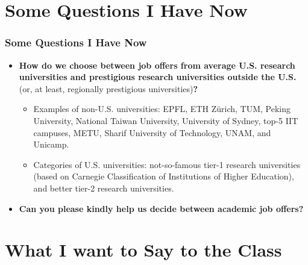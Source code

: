 \documentclass[xcolor={usenames,dvipsnames},hyperref={hyperindex,bookmarks}]{beamer}
\begin{document}
\section{Some Questions I Have Now}

\frame
{
	\frametitle{Some Questions I Have Now}

	\begin{itemize}
	\item {\bf How do we choose between job offers from average U.S. research universities and prestigious research universities outside the U.S.} (or, at least, regionally prestigious universities){\bf ?}
		\begin{itemize}
		\item Examples of non-U.S. universities: EPFL, ETH Z{\"{u}}rich, TUM, Peking University, National Taiwan University, University of Sydney, top-5 IIT campuses, METU, Sharif University of Technology, UNAM, and Unicamp.
		\item Categories of U.S. universities: not-so-famous tier-1 research universities (based on Carnegie Classification of Institutions of Higher Education), and better tier-2 research universities.
		\end{itemize}
	\item {\bf Can you please kindly help us decide between academic job offers?}
	\end{itemize}
}




\section{What I want to Say to the Class}
\end{document}
